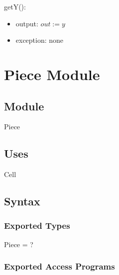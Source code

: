 \documentclass[12pt]{article}
\begin{document}
\noindent getY():
\begin{itemize}
\item output: $out := y$
\item exception: none
\end{itemize}

\newpage



































\section* {Piece Module}

\subsection*{Module}

Piece

\subsection* {Uses}

Cell

\subsection* {Syntax}

\subsubsection* {Exported Types}

Piece = ?

\subsubsection* {Exported Access Programs}
\end{document}
